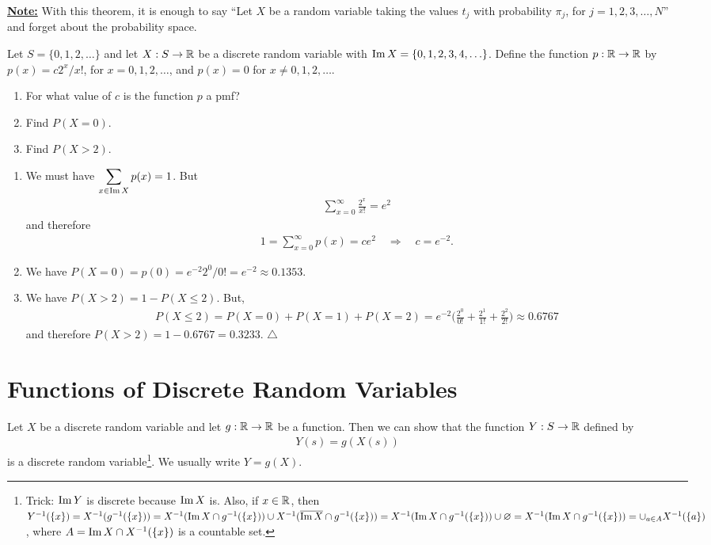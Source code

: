 \underline{\textbf{Note:}} With this theorem, it is enough to say ``Let $X$ be a random variable taking the values $t_j$ with probability $\pi_j$, for $j = 1, 2, 3, \ldots , N$'' and forget about the probability space.

\begin{example}
Let $S = \{ 0, 1 , 2, \ldots \}$ and let $X : S \rightarrow \mathbb{R}$ be a discrete random variable with $\operatorname{Im} X = \{0,  1 , 2, 3, 4 , \ldots \}$. Define the function $p : \mathbb{R} \rightarrow \mathbb{R}$ by $p (x) = c 2^x / x!$, for $x = 0, 1, 2, \ldots$, and $p(x) = 0$ for $x \neq 0, 1, 2, \ldots$. 
    \begin{enumerate}[label=\alph*)]
    \item For what value of $c$ is the function $p$ a pmf?
    \item Find $P (X = 0)$.
    \item Find $P (X > 2)$.
    \end{enumerate}
\end{example}

\begin{sol*}
\begin{enumerate}[label=\alph*)]
\item We must have $\displaystyle\sum_{x \in \operatorname{Im} X} p (x) = 1$. But
    \begin{align*}
    \sum_{x = 0}^\infty \frac{2^x}{x!} = e^2
    \end{align*} 
and therefore
    \begin{align*}
    1 = \sum_{x = 0}^\infty p(x) = c e^{2} \quad \Rightarrow \quad c = e^{-2} .
    \end{align*} 
\item We have $P (X = 0) = p(0) = e^{-2} 2^0 / 0! = e^{-2} \approx 0.1353$.
\item We have $P (X > 2) = 1 - P (X \leq 2)$. But,
    \begin{align*}
    P (X \leq 2) = P (X = 0) + P (X = 1) + P (X = 2) = e^{-2} \Big( \frac{2^0}{0!} + \frac{2^1}{1!} + \frac{2^2}{2!} \Big) \approx 0.6767
    \end{align*} 
and therefore $P (X > 2) = 1 - 0.6767 = 0.3233$. \hfill $\triangle$
\end{enumerate}
\end{sol*}

\section{Functions of Discrete Random Variables}
Let $X$ be a discrete random variable and let $g : \mathbb{R} \rightarrow \mathbb{R}$ be a function. Then we can show that the function $Y : S \rightarrow \mathbb{R}$ defined by
    \begin{align*}
    Y(s) = g (X(s))  
    \end{align*} 
is a discrete random variable\footnote{Trick: $\operatorname{Im} Y$ is discrete because $\operatorname{Im} X$ is. Also, if $x \in \mathbb{R}$, then $Y^{-1} (\{ x \}) = X^{-1} ( g^{-1} (\{ x \})) = X^{-1} (\operatorname{Im} X \cap g^{-1} (\{ x \})) \cup X^{-1} (\overline{\operatorname{Im} X} \cap g^{-1}(\{ x \}) ) = X^{-1} (\operatorname{Im} X \cap g^{-1} (\{ x \})) \cup \varnothing = X^{-1} (\operatorname{Im} X \cap g^{-1} (\{x \}) ) = \cup_{a \in A} X^{-1} (\{ a \} )$, where $A = \operatorname{Im} X \cap X^{-1} (\{ x \})$ is a countable set.}. We usually write $Y = g (X)$.

